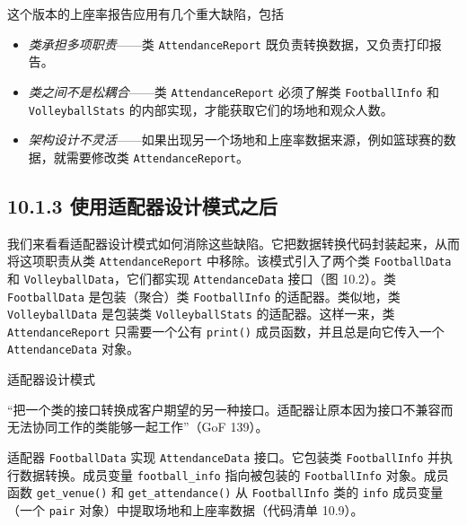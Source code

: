 这个版本的上座率报告应用有几个重大缺陷，包括

\begin{itemize}
\item \emph{类承担多项职责}——类 \texttt{Attendance\allowbreak{}Report} 既负责转换数据，又负责打印报告。
\item \emph{类之间不是松耦合}——类 \texttt{Attendance\allowbreak{}Report} 必须了解类 \texttt{Football\allowbreak{}Info} 和 \texttt{Volleyball\allowbreak{}Stats} 的内部实现，才能获取它们的场地和观众人数。
\item \emph{架构设计不灵活}——如果出现另一个场地和上座率数据来源，例如篮球赛的数据，就需要修改类 \texttt{Attendance\allowbreak{}Report}。
\end{itemize}

\subsection{10.1.3 使用适配器设计模式之后}

我们来看看适配器设计模式如何消除这些缺陷。它把数据转换代码封装起来，从而将这项职责从类 \texttt{Attendance\allowbreak{}Report} 中移除。该模式引入了两个类 \texttt{Football\allowbreak{}Data} 和 \texttt{Volleyball\allowbreak{}Data}，它们都实现 \texttt{Attendance\allowbreak{}Data} 接口（图 10.2）。类 \texttt{Football\allowbreak{}Data} 是包装（聚合）类 \texttt{Football\allowbreak{}Info} 的适配器。类似地，类 \texttt{Volleyball\allowbreak{}Data} 是包装类 \texttt{Volleyball\allowbreak{}Stats} 的适配器。这样一来，类 \texttt{Attendance\allowbreak{}Report} 只需要一个公有 \texttt{print()} 成员函数，并且总是向它传入一个 \texttt{Attendance\allowbreak{}Data} 对象。

\begin{mySidebar}{适配器设计模式}

“把一个类的接口转换成客户期望的另一种接口。适配器让原本因为接口不兼容而无法协同工作的类能够一起工作”（GoF 139）。
\end{mySidebar}

适配器 \texttt{Football\allowbreak{}Data} 实现 \texttt{Attendance\allowbreak{}Data} 接口。它包装类 \texttt{Football\allowbreak{}Info} 并执行数据转换。成员变量 \texttt{football\_\allowbreak{}info} 指向被包装的 \texttt{Football\allowbreak{}Info} 对象。成员函数 \texttt{get\_\allowbreak{}venue(\allowbreak{})\allowbreak{}} 和 \texttt{get\_\allowbreak{}attendance(\allowbreak{})\allowbreak{}} 从 \texttt{Football\allowbreak{}Info} 类的 \texttt{info} 成员变量（一个 \texttt{pair} 对象）中提取场地和上座率数据（代码清单 10.9）。

